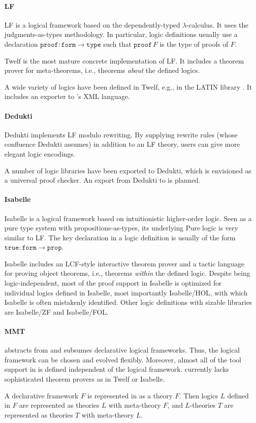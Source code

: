 \documentclass[12pt]{article}
\newcommand{\system}[2][]{\paragraph{#2}#2 \ifnonempty[\cite{#2}]{#1}{\cite{#1}}}
\begin{document}
\system{LF} is a logical framework based on the dependently-typed $\lambda$-calculus.
It uses the judgments-as-types methodology.
In particular, logic definitions usually use a declaration $\mathtt{proof}:\mathtt{form}\to\mathtt{type}$ such that $\mathtt{proof}\,F$ is the type of proofs of $F$.

Twelf \cite{twelf} is the most mature concrete implementation of LF.
It includes a theorem prover for meta-theorems, i.e., theorems \emph{about} the defined logics.

A wide variety of logics have been defined in Twelf, e.g., in the LATIN library \cite{CHKMR:latinabs:11}.
It includes an exporter to \mmt's XML language.

\system{Dedukti} implements LF modulo rewriting.
By supplying rewrite rules (whose confluence Dedukti assumes) in addition to an LF theory, users can give more elegant logic encodings.

A number of logic libraries have been exported to Dedukti, which is envisioned as a universal proof checker.
An export from Dedukti to \mmt is planned.

\system{Isabelle} is a logical framework based on intuitionistic higher-order logic.
Seen as a pure type system \cite{tps} with propositions-as-types, its underlying Pure logic is very similar to LF.
The key declaration in a logic definition is usually of the form $\mathtt{true}:\mathtt{form}\to\mathtt{prop}$.

Isabelle includes an LCF-style interactive theorem prover and a tactic language for proving object theorems, i.e., theorems \emph{within} the defined logic.
Despite being logic-independent, most of the proof support in Isabelle is optimized for individual logics defined in Isabelle, most importantly Isabelle/HOL, with which Isabelle is often mistakenly identified.
Other logic definitions with sizable libraries are Isabelle/ZF and Isabelle/FOL.

\paragraph{MMT}
\mmt abstracts from and subsumes declarative logical frameworks.
Thus, the logical framework can be chosen and evolved flexibly.
Moreover, almost all of the tool support in \mmt is defined independent of the logical framework.
\mmt currently lacks sophisticated theorem provers as in Twelf or Isabelle.

A declarative framework $F$ is represented in \mmt as a theory $F$.
Then logics $L$ defined in $F$ are represented as theories $L$ with meta-theory $F$, and $L$-theories $T$ are represented as theories $T$ with meta-theory $L$.
\end{document}
